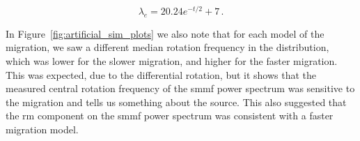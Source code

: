 \begin{equation}
\lambda_{e} = 20.24 e^{-t/2} + 7 \, .
\label{eq:exp_lats}
\end{equation}

In Figure~\ref{fig:artificial_sim_plots} we also note that for each model of the migration, we saw a different median rotation frequency in the distribution, which was lower for the slower migration, and higher for the faster migration. This was expected, due to the differential rotation, but it shows that the measured central rotation frequency of the \gls{smmf} power spectrum was sensitive to the migration and tells us something about the source. This also suggested that the \gls{rm} component on the \gls{smmf} power spectrum was consistent with a faster migration model.

\begin{figure}[!ht]
	\centering
	\qquad
	 \\
	
	\qquad
	

\end{figure}
